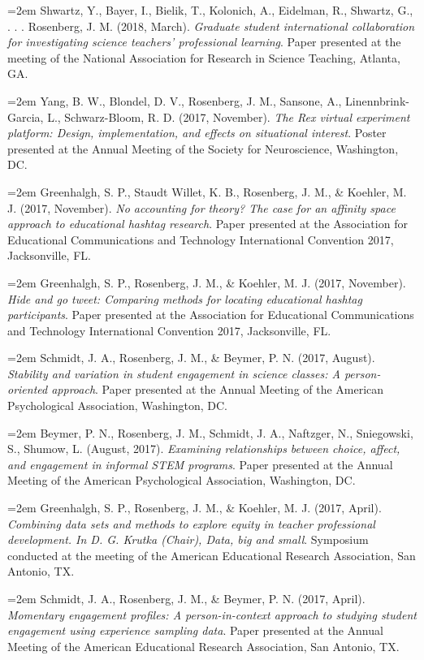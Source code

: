 \documentclass[
  14,
]{article}
\begin{document}
\hangindent=2em Shwartz, Y., Bayer, I., Bielik, T., Kolonich, A.,
Eidelman, R., Shwartz, G., . . . Rosenberg, J. M. (2018, March).
\emph{Graduate student international collaboration for investigating
science teachers' professional learning}. Paper presented at the meeting
of the National Association for Research in Science Teaching, Atlanta,
GA.

\hangindent=2em Yang, B. W., Blondel, D. V., Rosenberg, J. M., Sansone,
A., Linennbrink-Garcia, L., Schwarz-Bloom, R. D. (2017, November).
\emph{The Rex virtual experiment platform: Design, implementation, and
effects on situational interest}. Poster presented at the Annual Meeting
of the Society for Neuroscience, Washington, DC.

\hangindent=2em Greenhalgh, S. P., Staudt Willet, K. B., Rosenberg, J.
M., \& Koehler, M. J. (2017, November). \emph{No accounting for theory?
The case for an affinity space approach to educational hashtag
research}. Paper presented at the Association for Educational
Communications and Technology International Convention 2017,
Jacksonville, FL.

\hangindent=2em Greenhalgh, S. P., Rosenberg, J. M., \& Koehler, M. J.
(2017, November). \emph{Hide and go tweet: Comparing methods for
locating educational hashtag participants}. Paper presented at the
Association for Educational Communications and Technology International
Convention 2017, Jacksonville, FL.

\hangindent=2em Schmidt, J. A., Rosenberg, J. M., \& Beymer, P. N.
(2017, August). \emph{Stability and variation in student engagement in
science classes: A person-oriented approach}. Paper presented at the
Annual Meeting of the American Psychological Association, Washington,
DC.

\hangindent=2em Beymer, P. N., Rosenberg, J. M., Schmidt, J. A.,
Naftzger, N., Sniegowski, S., Shumow, L. (August, 2017). \emph{Examining
relationships between choice, affect, and engagement in informal STEM
programs}. Paper presented at the Annual Meeting of the American
Psychological Association, Washington, DC.

\hangindent=2em Greenhalgh, S. P., Rosenberg, J. M., \& Koehler, M. J.
(2017, April). \emph{Combining data sets and methods to explore equity
in teacher professional development. In D. G. Krutka (Chair), Data, big
and small}. Symposium conducted at the meeting of the American
Educational Research Association, San Antonio, TX.

\hangindent=2em Schmidt, J. A., Rosenberg, J. M., \& Beymer, P. N.
(2017, April). \emph{Momentary engagement profiles: A person-in-context
approach to studying student engagement using experience sampling data}.
Paper presented at the Annual Meeting of the American Educational
Research Association, San Antonio, TX.
\end{document}
